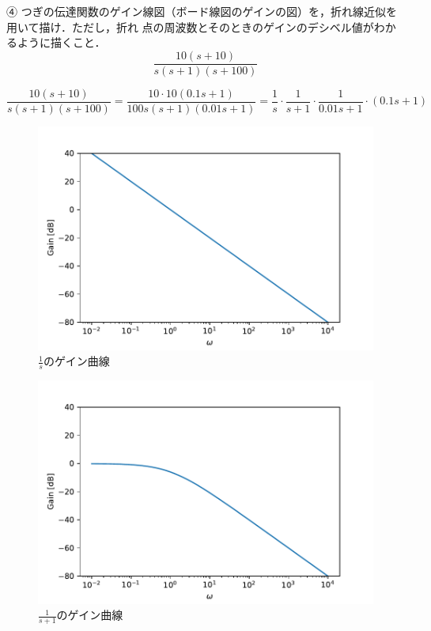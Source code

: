 ④ つぎの伝達関数のゲイン線図（ボード線図のゲインの図）を，折れ線近似を用いて描け．ただし，折れ
点の周波数とそのときのゲインのデシベル値がわかるように描くこと．
$$
\frac{10(s+10)}{s(s+1)(s+100)}
$$


$$
\frac{10(s+10)}{s(s+1)(s+100)}=\frac{10 \cdot 10(0.1 s+1)}{100 s(s+1)(0.01 s+1)}= \frac{1}{s} \cdot \frac{1}{s+1} \cdot \frac{1}{0.01 s+1} \cdot(0.1 s+1)
$$
\begin{figure}[H]
    \centering
    \includegraphics[scale=0.75]{1.pdf}
    \caption{$\frac{1}{s}$のゲイン曲線}
\end{figure}
\begin{figure}[H]
    \centering
    \includegraphics[scale=0.75]{2.pdf}
    \caption{$\frac{1}{s+1}$のゲイン曲線}
\end{figure}

